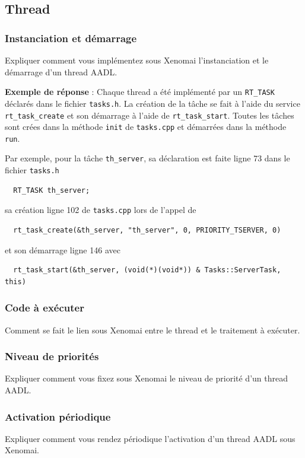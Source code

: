 \documentclass[11pt, a4paper]{paper}
\begin{document}
\subsection{Thread}
\subsubsection{Instanciation et démarrage}
 {\color{blue} Expliquer comment vous implémentez sous Xenomai l'instanciation et le démarrage d'un  thread AADL.}
 
 {\color{blue} {\bf Exemple de réponse} : Chaque thread a été implémenté par un {\tt RT\_TASK} déclarés dans le fichier {\tt tasks.h}. La création de la tâche se fait à l'aide du service {\tt rt\_task\_create} et son démarrage à l'aide de {\tt rt\_task\_start}. Toutes les tâches sont crées dans la méthode {\tt init} de {\tt tasks.cpp} et démarrées dans la méthode {\tt run}.

Par exemple, pour la tâche {\tt th\_server}, sa déclaration est faite ligne 73 dans le fichier {\tt tasks.h}
\begin{verbatim}
  RT_TASK th_server;
\end{verbatim}
sa création ligne 102 de {\tt tasks.cpp} lors de l'appel de
\begin{verbatim}
  rt_task_create(&th_server, "th_server", 0, PRIORITY_TSERVER, 0)
\end{verbatim}
et son démarrage ligne 146 avec
\begin{verbatim}
  rt_task_start(&th_server, (void(*)(void*)) & Tasks::ServerTask, this)
\end{verbatim}
}

\subsubsection{Code à exécuter}
 {\color{blue} Comment se fait le lien sous Xenomai entre le thread et le traitement à exécuter.}

\subsubsection{Niveau de priorités}
 {\color{blue} Expliquer comment vous fixez sous Xenomai le niveau de priorité d'un thread AADL.}

\subsubsection{Activation périodique}
 {\color{blue} Expliquer comment vous rendez périodique l'activation d'un thread AADL sous Xenomai.}
\end{document}

